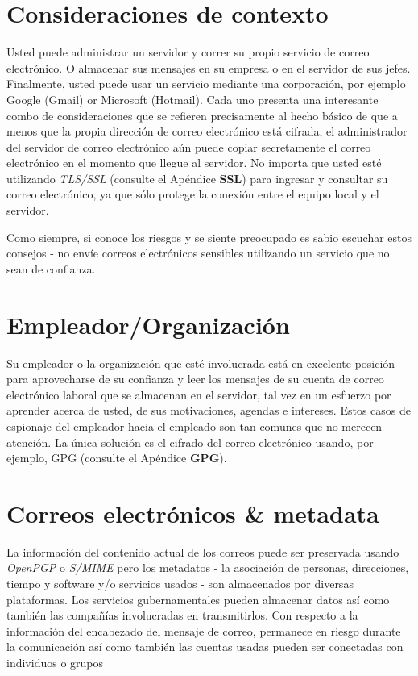 \documentclass[10pt,a5paper,twoside,,]{book}
\begin{document}
\section{Consideraciones de contexto}\label{consideraciones-de-contexto}

Usted puede administrar un servidor y correr su propio servicio de
correo electrónico. O almacenar sus mensajes en su empresa o en el
servidor de sus jefes. Finalmente, usted puede usar un servicio mediante
una corporación, por ejemplo Google (Gmail) or Microsoft (Hotmail). Cada
uno presenta una interesante combo de consideraciones que se refieren
precisamente al hecho básico de que a menos que la propia dirección de
correo electrónico está cifrada, el administrador del servidor de correo
electrónico aún puede copiar secretamente el correo electrónico en el
momento que llegue al servidor. No importa que usted esté utilizando
\emph{TLS/SSL} (consulte el Apéndice \textbf{SSL}) para ingresar y
consultar su correo electrónico, ya que sólo protege la conexión entre
el equipo local y el servidor.

Como siempre, si conoce los riesgos y se siente preocupado es sabio
escuchar estos consejos - no envíe correos electrónicos sensibles
utilizando un servicio que no sean de confianza.

\section{Empleador/Organización}\label{empleadororganizaciuxf3n}

Su empleador o la organización que esté involucrada está en excelente
posición para aprovecharse de su confianza y leer los mensajes de su
cuenta de correo electrónico laboral que se almacenan en el servidor,
tal vez en un esfuerzo por aprender acerca de usted, de sus
motivaciones, agendas e intereses. Estos casos de espionaje del
empleador hacia el empleado son tan comunes que no merecen atención. La
única solución es el cifrado del correo electrónico usando, por ejemplo,
GPG (consulte el Apéndice \textbf{GPG}).

\section{Correos electrónicos \&
metadata}\label{correos-electruxf3nicos-metadata}

La información del contenido actual de los correos puede ser preservada
usando \emph{OpenPGP} o \emph{S/MIME} pero los metadatos - la asociación
de personas, direcciones, tiempo y software y/o servicios usados - son
almacenados por diversas plataformas. Los servicios gubernamentales
pueden almacenar datos así como también las compañías involucradas en
transmitirlos. Con respecto a la información del encabezado del mensaje
de correo, permanece en riesgo durante la comunicación así como también
las cuentas usadas pueden ser conectadas con individuos o grupos
\end{document}
